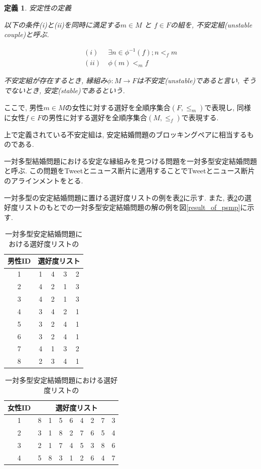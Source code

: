 \documentclass[12pt]{jarticle}
\newtheorem{definittion}{定義}[section]
\begin{document}
\begin{definittion}
\label{psmp_def_2}
安定性の定義

以下の条件(i)と(ii)を同時に満足する$m \in M$ と $f \in F$の組を, 不安定組(unstable couple)と呼ぶ. 

\begin{align}
(i) &\  \exists n \in \phi ^{-1} (f); n <_f m \\
(ii) &\  \phi(m) <_m f
\end{align}

不安定組が存在するとき, 縁組み$\phi: M \rightarrow F$は不安定(unstable)であると言い, そうでないとき, 安定(stable)であるという. 
\end{definittion}

ここで, 男性$m \in M$の女性に対する選好を全順序集合$(F, \leq _m)$で表現し, 同様に女性$f \in F$の男性に対する選好を全順序集合$(M, \leq _f)$で表現する. 

上で定義されている不安定組は, 安定結婚問題のブロッキングペアに相当するものである. 

一対多型結婚問題における安定な縁組みを見つける問題を一対多型安定結婚問題と呼ぶ. この問題をTweetとニュース断片に適用することでTweetとニュース断片のアラインメントをとる. 

一対多型の安定結婚問題に置ける選好度リストの例を表\ref{psmp_table}に示す. 
また, 表\ref{psmp_table}の選好度リストのもとでの一対多型安定結婚問題の解の例を図\ref{result_of_psmp}に示す. 

\begin{table}
\begin{center}
\caption{一対多型安定結婚問題における選好度リストの}
\label{psmp_table}
\begin{tabular}[t]{|c||c|c|c|c|}
\hline
男性ID & \multicolumn{4}{|c|}{選好度リスト} \\ \hline \hline
1 & 1 & 4 & 3 & 2 \\ \hline
2 & 4 & 2 & 1 & 3 \\ \hline
3 & 4 & 2 & 1 & 3 \\ \hline
4 & 3 & 4 & 2 & 1 \\ \hline
5 & 3 & 2 & 4 & 1 \\ \hline
6 & 3 & 2 & 4 & 1 \\ \hline
7 & 4 & 1 & 3 & 2 \\ \hline
8 & 2 & 3 & 4 & 1 \\ \hline
\end{tabular}
\begin{tabular}[t]{|c||c|c|c|c|c|c|c|c|}
\hline
女性ID & \multicolumn{8}{|c|}{選好度リスト} \\ \hline \hline
1 & 8 & 1 & 5 & 6 & 4 & 2 & 7 & 3 \\ \hline
2 & 3 & 1 & 8 & 2 & 7 & 6 & 5 & 4 \\ \hline
3 & 2 & 1 & 7 & 4 & 5 & 3 & 8 & 6 \\ \hline
4 & 5 & 8 & 3 & 1 & 2 & 6 & 4 & 7 \\ \hline
\end{tabular}
\end{center}
\end{table}
\end{document}
